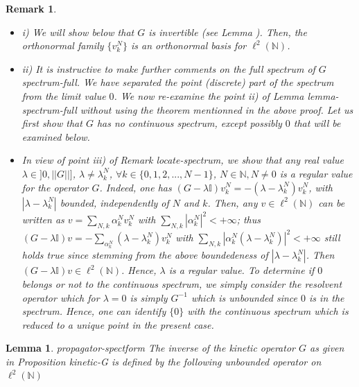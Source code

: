 \documentclass[10pt]{book}
\let\int\int
\theoremstyle{break}
\newtheorem{lemma}{Lemma}
\newtheorem{remark}{Remark}
\begin{document}
\begin{remark} 
\begin{itemize}
\item i) We will show below that $G$ is invertible (see Lemma ). Then, the orthonormal family $\{v^N_k \}$ is an orthonormal basis for $\ell^2(\mathbb{N})$.
\item ii) It is instructive to make further comments on the full spectrum of $G$ {spectrum-full}. We have separated the point (discrete) part of the spectrum from the limit value $0$. We now re-examine the point ii) of Lemma {lemma-spectrum-full} without using the theorem mentionned in the above proof. Let us first show that $G$ has no continuous spectrum, except possibly $0$ that will be examined below.
\item In view of point iii) of Remark {locate-spectrum}, we show that any real value $\lambda\in]0,||G||]$, $\lambda\ne\lambda^N_k$, $\forall k\in\{0,1,2,...,N-1 \}$, $N\in\mathbb{N}, N\ne0$ is a regular value for the operator $G$. Indeed, one has $(G-\lambda\mathbb{I})v^N_k=-(\lambda-\lambda^N_k)v^N_k$, with $|\lambda-\lambda^N_k|$ bounded, independently of $N$ and $k$. Then, any $v\in\ell^2(\mathbb{N})$ can be written as $v=\sum_{N,k}\alpha^N_kv^N_k$ with $\sum_{N,k}|\alpha^N_k|^2<+\infty$; thus $(G-\lambda\mathbb{I})v=-\sum_{\alpha^N_k}(\lambda-\lambda^N_k)v^N_k$ with $\sum_{N,k}|\alpha^N_k(\lambda-\lambda^N_k)
|^2<+\infty$ still holds true since stemming from the above boundedeness of $|\lambda-\lambda^N_k|$. Then $(G-\lambda\mathbb{I})v\in\ell^2(\mathbb{N})$. Hence, $\lambda$ is a regular value. To determine if $0$ belongs or not to the continuous spectrum, we simply consider the resolvent operator which for $\lambda=0$ is simply $G^{-1}$ which is unbounded since $0$ is in the spectrum. Hence, one can identify $\{0\}$ with the continuous spectrum which is reduced to a unique point in the present case.
\end{itemize}
\end{remark}
\begin{lemma}{propagator-spectform}
The inverse of the kinetic operator $G$ as given in Proposition {kinetic-G} is defined by the following unbounded operator on $\ell^2(\mathbb{N})$
\end{lemma}
\end{document}
